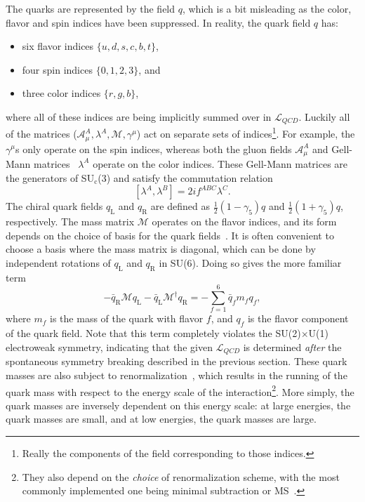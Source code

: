 The quarks are represented by the field $q$, which is a bit misleading as the color, flavor and spin indices have been suppressed. In reality, the quark field $q$ has:
%
\begin{itemize}
    \item six flavor indices $\{u, d, s, c, b, t\}$,
    \item four spin indices $\{0, 1, 2, 3\}$, and
    \item three color indices $\{r, g, b\}$,
\end{itemize}
%
where all of these indices are being implicitly summed over in $\mathcal{L}_{QCD}$. Luckily all of the matrices ($\mathcal{A}_\mu^A, \lambda^A, \mathcal{M}, \gamma^\mu$) act on separate sets of indices\footnote{Really the components of the field corresponding to those indices.}. For example, the $\gamma^\mu$s only operate on the spin indices, whereas both the gluon fields $\mathcal{A}_\mu^A$ and Gell-Mann matrices~\cite{GellMannMatrix} $\lambda^A$ operate on the color indices. These Gell-Mann matrices are the generators of SU$_\text{c}$(3) and satisfy the commutation relation
%
\begin{equation}
    \label{eq:gell_mann_commutation}
    [\lambda^A, \lambda^B] = 2if^{ABC}\lambda^C.
\end{equation}
%
The chiral quark fields $q_\text{L}$ and $q_\text{R}$ are defined as $\frac{1}{2}(1 - \gamma_5)q$ and $\frac{1}{2}(1 + \gamma_5)q$, respectively. The mass matrix $\mathcal{M}$ operates on the flavor indices, and its form depends on the choice of basis for the quark fields~\cite{QCDHistory}. It is often convenient to choose a basis where the mass matrix is diagonal, which can be done by independent rotations of $q_\text{L}$ and $q_\text{R}$ in SU(6). Doing so gives the more familiar term
%
\begin{equation}
    -\bar{q}_{\mathrm{R}} \mathcal{M} q_{\mathrm{L}}-\bar{q}_{\mathrm{L}} \mathcal{M}^{\dagger} q_{\mathrm{R}} = -\sum_{f = 1}^{6}\bar{q}_f m_f q_f,
    \label{eq:mass_matrix}
\end{equation}
where $m_f$ is the mass of the quark with flavor $f$, and $q_f$ is the flavor component of the quark field. Note that this term completely violates the SU(2)$\times$U(1) electroweak symmetry, indicating that the given $\mathcal{L}_{QCD}$ is determined \textit{after} the spontaneous symmetry breaking described in the previous section. These quark masses are also subject to renormalization~\cite{MassRenorm}, which results in the running of the quark mass with respect to the energy scale of the interaction\footnote{They also depend on the \textit{choice} of renormalization scheme, with the most commonly implemented one being minimal subtraction or MS~\cite{MSScheme}.}. More simply, the quark masses are inversely dependent on this energy scale: at large energies, the quark masses are small, and at low energies, the quark masses are large. 

